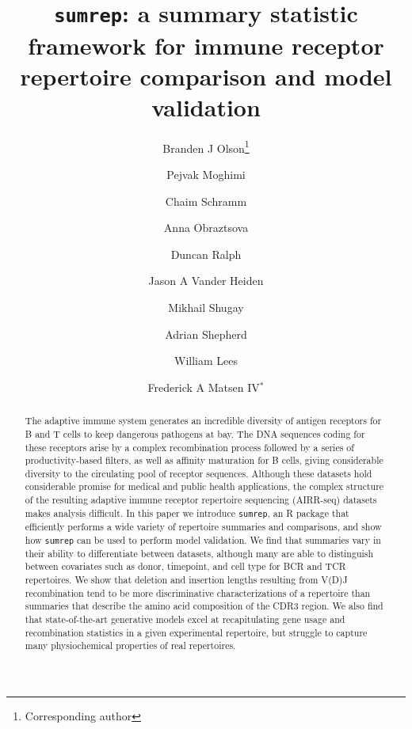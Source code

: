 \documentclass{article}
\begin{document}
\title{\texttt{sumrep}: a summary statistic framework for immune receptor repertoire comparison and model validation}
\author[1, 2]{Branden J Olson\thanks{Corresponding author}}
\author[3]{Pejvak Moghimi}
\author[4]{Chaim Schramm}
\author[5,7]{Anna Obraztsova}
\author[1]{Duncan Ralph}
\author[6]{Jason A Vander Heiden}
\author[5,7,8]{Mikhail Shugay}
\author[3]{Adrian Shepherd}
\author[3]{William Lees}
\author[1]{Frederick A Matsen IV$^*$}

\date{}

\maketitle

\begin{abstract}
The adaptive immune system generates an incredible diversity of antigen receptors for B and T cells to keep dangerous pathogens at bay.
The DNA sequences coding for these receptors arise by a complex recombination process followed by a series of productivity-based filters, as well as affinity maturation for B cells, giving considerable diversity to the circulating pool of receptor sequences.
Although these datasets hold considerable promise for medical and public health applications, the complex structure of the resulting adaptive immune receptor repertoire sequencing (AIRR-seq) datasets makes analysis difficult.
In this paper we introduce \texttt{sumrep}, an R package that efficiently performs a wide variety of repertoire summaries and comparisons, and show how \texttt{sumrep} can be used to perform model validation.
We find that summaries vary in their ability to differentiate between datasets, although many are able to distinguish between covariates such as donor, timepoint, and cell type for BCR and TCR repertoires.
We show that deletion and insertion lengths resulting from V(D)J recombination tend to be more discriminative characterizations of a repertoire than summaries that describe the amino acid composition of the CDR3 region.
We also find that state-of-the-art generative models excel at recapitulating gene usage and recombination statistics in a given experimental repertoire, but struggle to capture many physiochemical properties of real repertoires.
\end{abstract}
\end{document}
